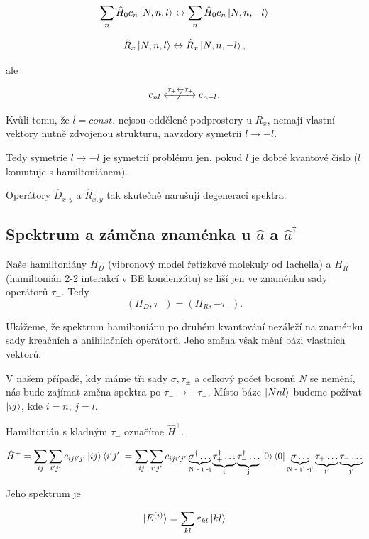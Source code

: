 \documentclass{article}
\begin{document}
    $$\sum_{n} \hat{H}_0 c_{n}\ket{N,n,l} \leftrightarrow \sum_{n} \hat{H}_0 c_{n}\ket{N,n,-l}$$

    $$\hat{R}_{x} \ket{N,n,l} \leftrightarrow \hat{R}_{x} \ket{N,n,-l},$$

    ale

    $$c_{nl} \centernot{\xleftrightarrow{\tau_+ \leftrightarrow \tau_+}} c_{n-l}.$$

    Kvůli tomu, že $l = const.$ nejsou oddělené podprostory u $R_{x}$, nemají vlastní vektory nutně zdvojenou strukturu, navzdory symetrii 
    $l \rightarrow -l$.


    Tedy symetrie $l \rightarrow -l$ je symetrií problému jen, pokud $l$ je dobré kvantové číslo ($l$  komutuje s hamiltoniánem).

Operátory $\hat{D}_{x,y}$ a $\hat{R}_{x,y}$ tak skutečně narušují degeneraci spektra.


    \subsection{Spektrum a záměna znaménka u $\hat{a}$ a $\hat{a}^{\dagger}$ }


    Naše hamiltoniány $H_D$ (vibronový model řetízkové molekuly od Iachella) a $H_R$ (hamiltonián 2-2 interakcí v BE kondenzátu)
    se liší jen ve znaménku sady operátorů $\tau_-$. Tedy 
    $$(H_D,\tau_-) = (H_R,-\tau_-).$$
    
    Ukážeme, že spektrum hamiltoniánu po druhém kvantování nezáleží na znaménku sady kreačních a anihilačních operátorů. Jeho změna však
    mění bázi vlastních vektorů.

    V našem případě, kdy máme tři sady $\sigma, \tau_{\pm}$ a celkový počet bosonů $N$ se nemění, nás bude zajímat změna spektra po $\tau_- \rightarrow -\tau_-$.
    Místo báze $\ket{Nnl}$ budeme požívat $\ket{ij}$, kde $i = n$, $j = l$.

    Hamiltonián s kladným $\tau_-$ označíme $\hat{H}^+$.

    $$\hat{H}^+ = \sum_{i j} \sum_{i' j'} c_{iji'j'} \ket{ij}\bra{i'j'}
    = \sum_{i j} \sum_{i' j'} c_{iji'j'} \underbrace{\sigma^{\dagger} \dots}_\text{N - i -j}
    \underbrace{\tau^{\dagger}_+ \dots}_\text{i}
    \underbrace{\tau^{\dagger}_- \dots}_\text{j} 
    \ket{0}\bra{0} \underbrace{\sigma\dots}_\text{N - i' -j'}
    \underbrace{\tau_+ \dots}_\text{i'}
    \underbrace{\tau_- \dots}_\text{j'}$$


    Jeho spektrum je 

    $$\ket{E^{(i)}} =  \sum_{kl} \varepsilon_{kl} \ket{kl}$$
\end{document}
